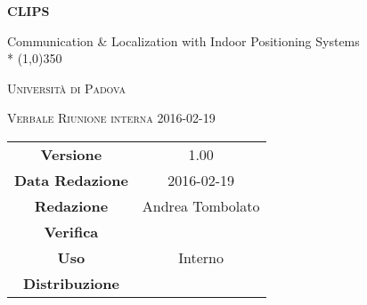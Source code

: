 \documentclass[a4paper,12pt]{article}
\author{Davide Castello}
\date{05/01/2013}
\begin{document}
\begin{titlepage}
	\centering
	{\huge\bfseries CLIPS\par}
	Communication \& Localization with Indoor Positioning Systems \\*
	\line(1,0){350} \\
	{\scshape\LARGE Università di Padova \par}
	\vspace{1cm}
	{\scshape\Large Verbale Riunione interna 2016-02-19 \par}
	\logo
	\newpage
	\begin{tabular}{c|c}
		{\hfill \textbf{Versione}} 			& 1.00				\\
		{\hfill\textbf{Data Redazione}} 	& 2016-02-19  		\\
		{\hfill\textbf{Redazione}} 			& Andrea Tombolato	\\
		{\hfill\textbf{Verifica}} 			& 		\\
		{\hfill\textbf{Uso}} 				& Interno			\\
		{\hfill\textbf{Distribuzione}} 		& \leaf\			\\
	\end{tabular}
\end{titlepage}
	
	\newpage

	
	\label{LastFrontPage}
	

	\newpage
	
	\pagestyle{mymain}
	
	
		

	
		
	
	
		
	
	
		
				
	\label{LastPage}
\end{document}
